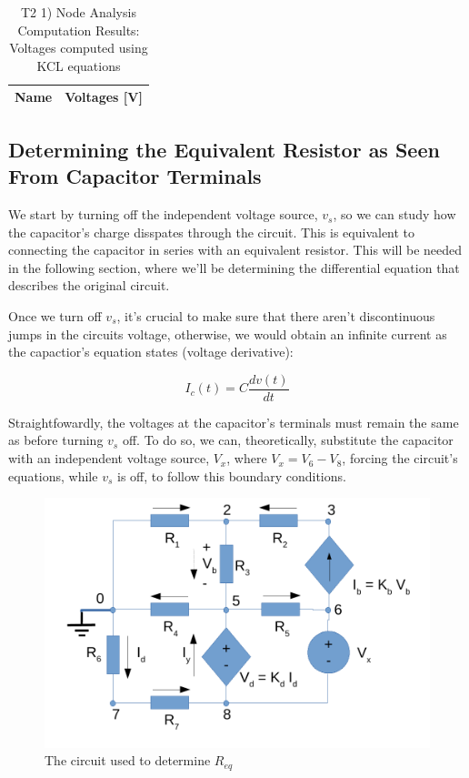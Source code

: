 \begin{table}[h]
  \centering
  \begin{tabular}{|l|r|}
    \hline    
    {\bf Name} & {\bf Voltages [V]} \\ \hline
    
  \end{tabular}
  \caption{T2 1) Node Analysis Computation Results: Voltages computed using KCL equations}
  \label{tab:nodeVoltages1}
\end{table}





\newpage

\subsection{Determining the Equivalent Resistor as Seen From Capacitor Terminals}

We start by turning off the independent voltage source, $v_s$, so we can study how the capacitor's charge disspates through the circuit. This is equivalent to connecting the capacitor in series with an equivalent resistor. This will be needed in the following section, where we'll be determining the differential equation that describes the original circuit.

Once we turn off $v_s$, it's crucial to make sure that there aren't discontinuous jumps in the circuits voltage, otherwise, we would obtain an infinite current as the capactior's equation states (voltage derivative):

\begin{center}
  \begin{equation}
    I_c(t) =  C \frac{dv(t)}{dt}
  \end{equation} 
\end{center}

Straightfowardly, the voltages at the capacitor's terminals must remain the same as before turning $v_s$ off. To do so, we can, theoretically, substitute the capacitor with an independent voltage source, $V_x$, where $V_x = V_6- V_8$, forcing the circuit's equations, while $v_s$ is off, to follow this boundary conditions.


\begin{figure}[h] \centering
\includegraphics[width=0.5\linewidth]{t2-t2.pdf}
\caption{The circuit used to determine $R_{eq}$}
\label{fig3}
\end{figure}

